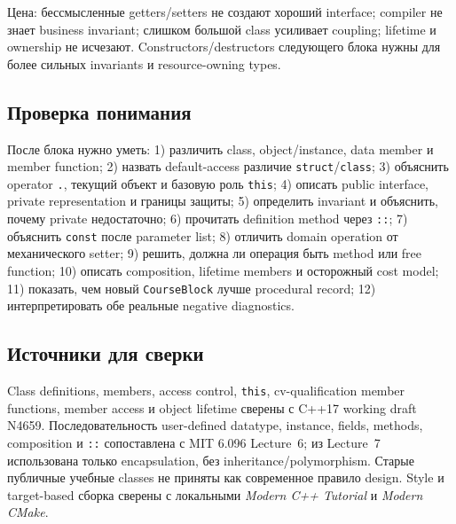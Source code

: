 Цена: бессмысленные getters/setters не создают хороший interface; compiler не
знает business invariant; слишком большой class усиливает coupling; lifetime
и ownership не исчезают. Constructors/destructors следующего блока нужны для
более сильных invariants и resource-owning types.

\subsection{Проверка понимания}

После блока нужно уметь:
1) различить class, object/instance, data member и member function; 2) назвать default-access различие \texttt{struct}/\texttt{class}; 3) объяснить operator \texttt{.}, текущий объект и базовую роль \texttt{this}; 4) описать public interface, private representation и границы защиты; 5) определить invariant и объяснить, почему private недостаточно; 6) прочитать definition method через \texttt{::}; 7) объяснить \texttt{const} после parameter list; 8) отличить domain operation от механического setter; 9) решить, должна ли операция быть method или free function; 10) описать composition, lifetime members и осторожный cost model; 11) показать, чем новый \texttt{CourseBlock} лучше procedural record; 12) интерпретировать обе реальные negative diagnostics.

\subsection{Источники для сверки}

Class definitions, members, access control, \texttt{this}, cv-qualification
member functions, member access и object lifetime сверены с C++17 working
draft N4659. Последовательность user-defined datatype, instance, fields,
methods, composition и \texttt{::} сопоставлена с MIT 6.096 Lecture~6; из
Lecture~7 использована только encapsulation, без inheritance/polymorphism.
Старые публичные учебные classes не приняты как современное правило design.
Style и target-based сборка сверены с локальными \textit{Modern C++ Tutorial}
и \textit{Modern CMake}.
